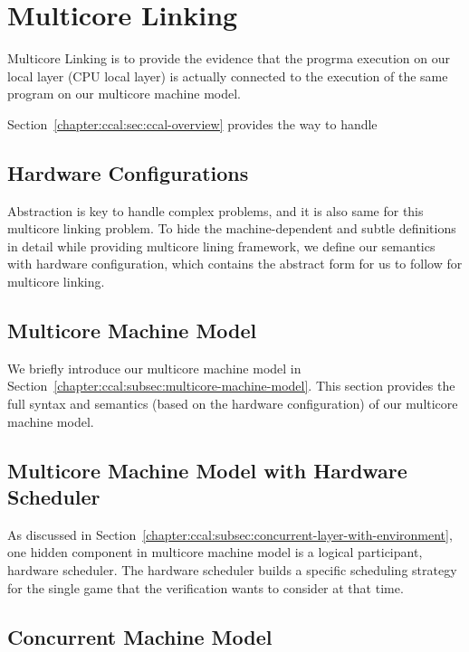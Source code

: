 \section{Multicore Linking}
\label{chapter:linking:sec:multicore-linking}

Multicore Linking is to provide the evidence that the progrma execution on
our local layer (CPU local layer) is actually connected to the execution of the same program 
on our multicore machine model. 

Section~\ref{chapter:ccal:sec:ccal-overview} provides the way to handle 


\subsection{Hardware Configurations}
\label{chapter:linking:subsec:hardware-configuration}

Abstraction is key to handle complex problems, and it is also same for this multicore linking problem.
To hide the machine-dependent and subtle definitions in detail while providing multicore lining framework, 
we define our semantics with hardware configuration, 
which contains the abstract form for us to follow for multicore linking.

\subsection{Multicore Machine Model}
\label{chapter:linking:subsec:multicore-machine-model}

We briefly introduce our multicore machine model in Section~\ref{chapter:ccal:subsec:multicore-machine-model}.
This section provides the full syntax and semantics (based on the hardware configuration) of our multicore machine model. 


\subsection{Multicore Machine Model with Hardware Scheduler}
\label{chapter:linking:subsec:multicore-machine-model-with-hardware-scheduler}

As discussed in Section~\ref{chapter:ccal:subsec:concurrent-layer-with-environment}, 
one hidden component in multicore machine model is a logical participant, hardware scheduler. 
The hardware scheduler builds a specific scheduling strategy for the single game that the 
verification wants to consider at that time.  


\subsection{Concurrent Machine Model}
\label{chapter:linking:subsec:concurrent-machine-model}

